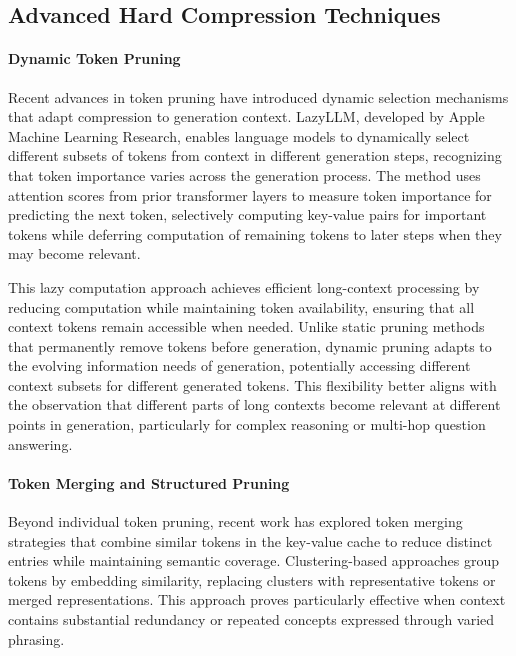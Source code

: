 \subsection{Advanced Hard Compression Techniques}

\paragraph{Dynamic Token Pruning}

Recent advances in token pruning have introduced dynamic selection mechanisms that adapt compression to generation context. LazyLLM, developed by Apple Machine Learning Research, enables language models to dynamically select different subsets of tokens from context in different generation steps, recognizing that token importance varies across the generation process. The method uses attention scores from prior transformer layers to measure token importance for predicting the next token, selectively computing key-value pairs for important tokens while deferring computation of remaining tokens to later steps when they may become relevant.

This lazy computation approach achieves efficient long-context processing by reducing computation while maintaining token availability, ensuring that all context tokens remain accessible when needed. Unlike static pruning methods that permanently remove tokens before generation, dynamic pruning adapts to the evolving information needs of generation, potentially accessing different context subsets for different generated tokens. This flexibility better aligns with the observation that different parts of long contexts become relevant at different points in generation, particularly for complex reasoning or multi-hop question answering.

\paragraph{Token Merging and Structured Pruning}

Beyond individual token pruning, recent work has explored token merging strategies that combine similar tokens in the key-value cache to reduce distinct entries while maintaining semantic coverage. Clustering-based approaches group tokens by embedding similarity, replacing clusters with representative tokens or merged representations. This approach proves particularly effective when context contains substantial redundancy or repeated concepts expressed through varied phrasing.

